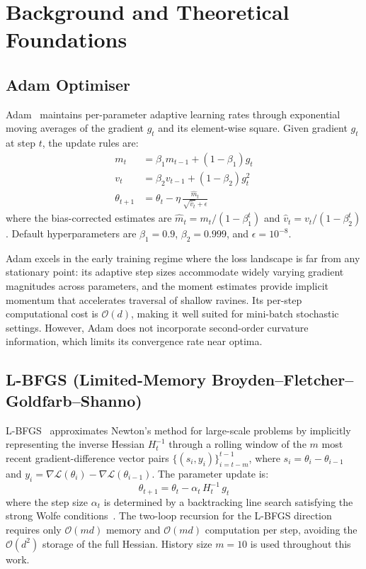 \documentclass[12pt,a4paper]{article}
\begin{document}
\section{Background and Theoretical Foundations}

\subsection{Adam Optimiser}

Adam~\cite{kingma2015adam} maintains per-parameter adaptive learning
rates through exponential moving averages of the gradient $g_t$ and
its element-wise square.  Given gradient $g_t$ at step $t$, the
update rules are:
\begin{align}
m_t &= \beta_1 m_{t-1} + (1-\beta_1)g_t \label{eq:adam1}\\
v_t &= \beta_2 v_{t-1} + (1-\beta_2)g_t^2 \label{eq:adam2}\\
\theta_{t+1} &= \theta_t - \eta\,\frac{\hat{m}_t}{\sqrt{\hat{v}_t}+\epsilon}
\label{eq:adam3}
\end{align}
where the bias-corrected estimates are $\hat{m}_t = m_t/(1-\beta_1^t)$
and $\hat{v}_t = v_t/(1-\beta_2^t)$.  Default hyperparameters are
$\beta_1 = 0.9$, $\beta_2 = 0.999$, and $\epsilon = 10^{-8}$.

Adam excels in the early training regime where the loss landscape is
far from any stationary point: its adaptive step sizes accommodate
widely varying gradient magnitudes across parameters, and the moment
estimates provide implicit momentum that accelerates traversal of
shallow ravines.  Its per-step computational cost is $\mathcal{O}(d)$,
making it well suited for mini-batch stochastic settings.  However,
Adam does not incorporate second-order curvature information, which
limits its convergence rate near optima.

\subsection{L-BFGS (Limited-Memory Broyden--Fletcher--Goldfarb--Shanno)}

L-BFGS~\cite{liu1989lbfgs,byrd1995} approximates Newton's method for
large-scale problems by implicitly representing the inverse Hessian
$H_t^{-1}$ through a rolling window of the $m$ most recent
gradient-difference vector pairs $\{(s_i, y_i)\}_{i=t-m}^{t-1}$,
where $s_i = \theta_i - \theta_{i-1}$ and
$y_i = \nabla\mathcal{L}(\theta_i) - \nabla\mathcal{L}(\theta_{i-1})$.
The parameter update is:
\begin{equation}
\theta_{t+1} = \theta_t - \alpha_t\,H_t^{-1}\,g_t
\label{eq:lbfgs}
\end{equation}
where the step size $\alpha_t$ is determined by a backtracking line
search satisfying the strong Wolfe conditions~\cite{wolfe1969}.  The
two-loop recursion for the L-BFGS direction requires only
$\mathcal{O}(md)$ memory and $\mathcal{O}(md)$ computation per step,
avoiding the $\mathcal{O}(d^2)$ storage of the full Hessian.  History
size $m = 10$ is used throughout this work.
\end{document}
